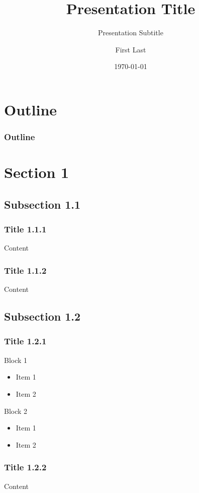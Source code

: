 \documentclass[compress,12pt]{beamer}%
\title{Presentation Title}
\subtitle{Presentation Subtitle}
\author{First Last}
\institute[ABBR]{Full Name}
\date{\today}
\begin{document}
{
\begin{frame}[noframenumbering]
  \titlepage
\end{frame}
}

\section*{Outline}
\begin{frame}
\frametitle{Outline}
\tableofcontents[currentsubsection,hideothersubsections,sectionstyle=show,subsectionstyle=hide]
\end{frame}

\section{Section 1}
\subsection{Subsection 1.1}
\begin{frame}
\frametitle{Title 1.1.1}
Content
\end{frame}

\begin{frame}
\frametitle{Title 1.1.2}
Content
\end{frame}

\subsection{Subsection 1.2}
\begin{frame}
\frametitle{Title 1.2.1}
\begin{block}{Block 1}
\begin{itemize}
\item Item 1
\item Item 2
\end{itemize}
\end{block}
\begin{block}{Block 2}
\begin{itemize}
\item Item 1
\item Item 2
\end{itemize}
\end{block}

\end{frame}

\begin{frame}
\frametitle{Title 1.2.2}
Content
\end{frame}
\end{document}
